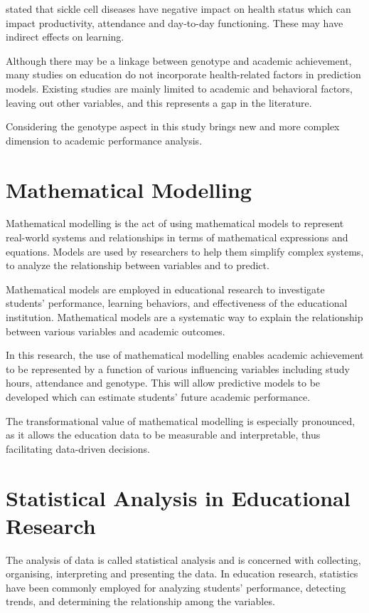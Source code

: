 \documentclass[12pt]{report}
\begin{document}
	\citet{WHO2020} stated that sickle cell diseases have negative impact on health status which can impact productivity, attendance and day-to-day functioning. These may have indirect effects on learning.
	
	Although there may be a linkage between genotype and academic achievement, many studies on education do not incorporate health-related factors in prediction models. Existing studies are mainly limited to academic and behavioral factors, leaving out other variables, and this represents a gap in the literature.
	
	Considering the genotype aspect in this study brings new and more complex dimension to academic performance analysis.
	\section{Mathematical Modelling}
	Mathematical modelling is the act of using mathematical models to represent real-world systems and relationships in terms of mathematical expressions and equations. Models are used by researchers to help them simplify complex systems, to analyze the relationship between variables and to predict.
	
	Mathematical models are employed in educational research to investigate students' performance, learning behaviors, and effectiveness of the educational institution. Mathematical models are a systematic way to explain the relationship between various variables and academic outcomes.
	
	In this research, the use of mathematical modelling enables academic achievement to be represented by a function of various influencing variables including study hours, attendance and genotype. This will allow predictive models to be developed which can estimate students' future academic performance.
	
	The transformational value of mathematical modelling is especially pronounced, as it allows the education data to be measurable and interpretable, thus facilitating data-driven decisions.
	\section{Statistical Analysis in Educational Research}
	The analysis of data is called statistical analysis and is concerned with collecting, organising, interpreting and presenting the data. In education research, statistics have been commonly employed for analyzing students' performance, detecting trends, and determining the relationship among the variables.
	
\end{document}
